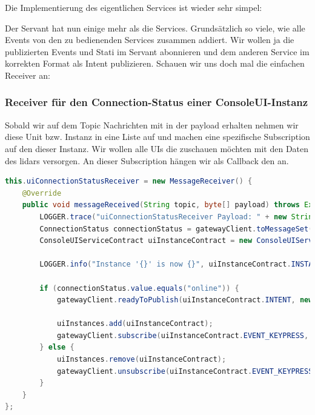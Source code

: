 Die Implementierung des eigentlichen Services ist wieder sehr simpel:


Der Servant hat nun einige  mehr als die Services. Grundsätzlich so viele, wie alle Events von den zu bedienenden Services zusammen addiert. Wir wollen ja die publizierten Events und Stati im Servant abonnieren und dem anderen Service im korrekten Format als Intent publizieren.
Schauen wir uns doch mal die einfachen Receiver an:
\subsubsection{Receiver für den Connection-Status einer ConsoleUI-Instanz}
Sobald wir auf dem Topic  Nachrichten mit  in der \Gls{payload} erhalten nehmen wir diese Unit bzw. Instanz in eine Liste auf und machen eine spezifische Subscription auf den \texttt{} dieser Instanz. Wir wollen alle UIs die zuschauen möchten mit den Daten des \acrshort{lidar}s versorgen. An dieser Subscription hängen wir als Callback den  an.
\begin{lstlisting}[language=Java,caption={MessageReceiver für den Connection-Status einer ConsoleUI-Instanz im Servant},label={lst:servant-uiConnectionStatusReceiver}]
this.uiConnectionStatusReceiver = new MessageReceiver() {
    @Override
    public void messageReceived(String topic, byte[] payload) throws Exception {
        LOGGER.trace("uiConnectionStatusReceiver Payload: " + new String(payload));
        ConnectionStatus connectionStatus = gatewayClient.toMessageSet(payload, ConnectionStatus.class).last();
        ConsoleUIServiceContract uiInstanceContract = new ConsoleUIServiceContract(topic, true);

        LOGGER.info("Instance '{}' is now {}", uiInstanceContract.INSTANCE, connectionStatus.value);

        if (connectionStatus.value.equals("online")) {
            gatewayClient.readyToPublish(uiInstanceContract.INTENT, new ConsoleIntent("This is a message from the Servant, we now have a connection together.") );

            uiInstances.add(uiInstanceContract);
            gatewayClient.subscribe(uiInstanceContract.EVENT_KEYPRESS, keyPressReceiver);
        } else {
            uiInstances.remove(uiInstanceContract);
            gatewayClient.unsubscribe(uiInstanceContract.EVENT_KEYPRESS);
        }
    }
};
\end{lstlisting}

